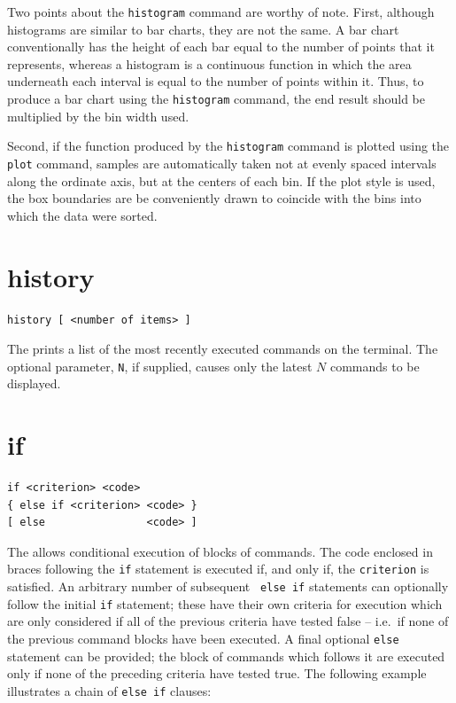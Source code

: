 Two points about the {\tt histogram} command are worthy of note. First,
although histograms are similar to bar charts, they are not the same.  A bar
chart conventionally has the height of each bar equal to the number of points
that it represents, whereas a histogram is a continuous function in which the
area underneath each interval is equal to the number of points within it.
Thus, to produce a bar chart using the {\tt histogram} command, the end result
should be multiplied by the bin width used.

Second, if the function produced by the {\tt histogram} command is plotted
using the {\tt plot} command, samples are automatically taken not at evenly
spaced intervals along the ordinate axis, but at the centers of each bin. If
the  plot style is used, the box boundaries are be conveniently
drawn to coincide with the bins into which the data were sorted.


\section{history}

\begin{verbatim}
history [ <number of items> ]
\end{verbatim}

The  prints a list of the most recently executed commands on
the terminal.  The optional parameter, {\tt N}, if supplied, causes only the
latest $N$ commands to be displayed.


\section{if}

\begin{verbatim}
if <criterion> <code>
{ else if <criterion> <code> }
[ else                <code> ]
\end{verbatim}

The  allows conditional execution of blocks of commands.  The code
enclosed in braces following the {\tt if} statement is executed if, and only
if, the {\tt criterion} is satisfied.  An arbitrary number of subsequent {\tt
else if} statements can optionally follow the initial {\tt if} statement; these
have their own criteria for execution which are only considered if all of the
previous criteria have tested false -- i.e.\ if none of the previous command
blocks have been executed.  A final optional {\tt else} statement can be
provided; the block of commands which follows it are executed only if none of
the preceding criteria have tested true.  The following example illustrates a
chain of {\tt else if} clauses:

